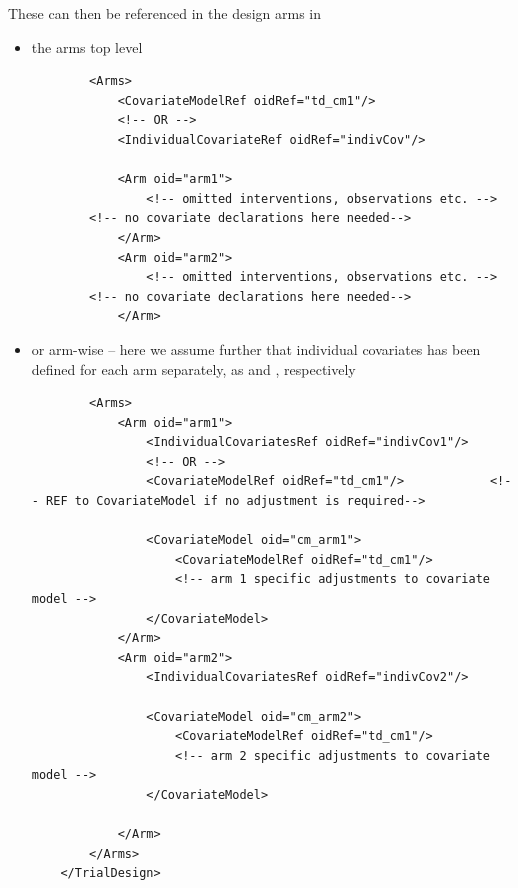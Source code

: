 These can then be referenced in the design arms in 
\begin{itemize}
\item 
the arms top level
\lstset{language=XML}
\begin{lstlisting}        
        <Arms>
            <CovariateModelRef oidRef="td_cm1"/>
            <!-- OR -->
            <IndividualCovariateRef oidRef="indivCov"/> 
            
            <Arm oid="arm1">
            	<!-- omitted interventions, observations etc. -->
		<!-- no covariate declarations here needed-->
            </Arm>
            <Arm oid="arm2">
            	<!-- omitted interventions, observations etc. -->
		<!-- no covariate declarations here needed-->
            </Arm>
\end{lstlisting}
\item 
or arm-wise -- here we assume further that individual covariates has been 
defined for each arm separately, as  and , respectively
\lstset{language=XML}
\begin{lstlisting}
        <Arms>
            <Arm oid="arm1">
                <IndividualCovariatesRef oidRef="indivCov1"/>
                <!-- OR -->
                <CovariateModelRef oidRef="td_cm1"/>            <!-- REF to CovariateModel if no adjustment is required-->
                
                <CovariateModel oid="cm_arm1">
                    <CovariateModelRef oidRef="td_cm1"/> 
                    <!-- arm 1 specific adjustments to covariate model -->
                </CovariateModel>
            </Arm>
            <Arm oid="arm2">
                <IndividualCovariatesRef oidRef="indivCov2"/>
                
                <CovariateModel oid="cm_arm2">
                    <CovariateModelRef oidRef="td_cm1"/>
                    <!-- arm 2 specific adjustments to covariate model -->
                </CovariateModel>
                
            </Arm>
        </Arms>
    </TrialDesign>
\end{lstlisting}

\end{itemize}

%


